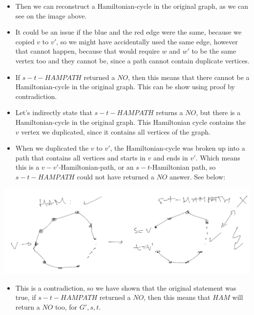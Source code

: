 \begin{itemize}
    \item Then we can reconstruct a Hamiltonian-cycle in the original graph, as we can see on the image above.
    \item It could be an issue if the blue and the red edge were the same, because we copied $v$ to $v'$, so we might have accidentally used the same edge, however that cannot happen, because that would require $w$ and $w'$ to be the same vertex too and they cannot be, since a path cannot contain duplicate vertices.
    \item If $s-t-HAMPATH$ returned a $NO$, then this means that there cannot be a Hamiltonian-cycle in the original graph. This can be show using proof by contradiction.
    \item Let's indirectly state that $s-t-HAMPATH$ returns a $NO$, but there is a Hamiltonian-cycle in the original graph. This Hamiltonian cycle contains the $v$ vertex we duplicated, since it contains all vertices of the graph.
    \item When we duplicated the $v$ to $v'$, the Hamiltonian-cycle was broken up into a path that contains all vertices and starts in $v$ and ends in $v'$. Which means this is a $v-v'$-Hamiltonian-path, or an $s-t$-Hamiltonian path, so $s-t-HAMPATH$ could not have returned a $NO$ answer. See below:
\end{itemize}

\begin{center}
\includegraphics[width=\linewidth]{./08/03/ham_no.png}
\end{center}

\begin{itemize}
    \item This is a contradiction, so we have shown that the original statement was true, if $s-t-HAMPATH$ returned a $NO$, then this means that $HAM$ will return a $NO$ too, for $G', s, t$.
\end{itemize}